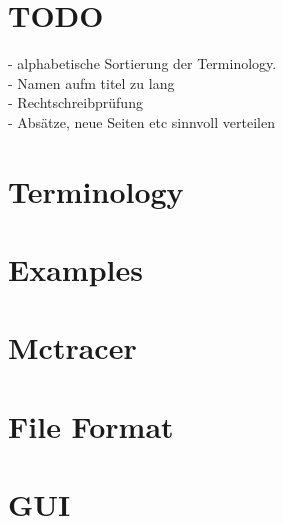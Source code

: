 \documentclass{scrartcl}
\begin{document}
\maketitle
\tableofcontents
\newpage

\section{TODO}
- alphabetische Sortierung der Terminology. \\
- Namen aufm titel zu lang \\
- Rechtschreibprüfung \\
- Absätze, neue Seiten etc sinnvoll verteilen \\

\section{Terminology} 
\section{Examples} 
\section{Mctracer} 
\section{File Format} 
\section{GUI} 
\end{document}
